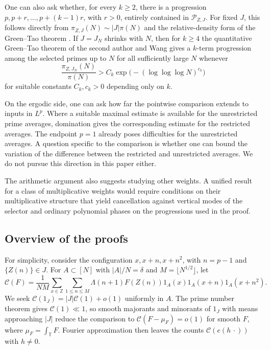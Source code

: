 \documentclass[12pt]{amsart}
\newcommand{\1}{\mathbf 1}
\theoremstyle{definition}
\begin{document}
One can also ask whether, for every $k\geq2$, there is a progression
$p,p+r,\ldots,p+(k-1)r$, with $r>0$, entirely contained in
$\mathcal P_{Z,J}$. For fixed $J$, this follows directly from
$\pi_{Z,J}(N)\sim |J|\pi(N)$ and the relative-density form of the
Green--Tao theorem \cite{GreenTao}. If $J=J_N$ shrinks with $N$, then for $k\geq4$ the quantitative
Green--Tao theorem of the second author and Wang
\cite[Theorem~1.1]{TeravainenWang} gives a $k$-term progression
among the selected primes up to $N$ for all sufficiently large
$N$ whenever
\[
 \frac{\pi_{Z,J_N}(N)}{\pi(N)}
 > C_k\exp\bigl(-(\log\log\log N)^{c_k}\bigr)
\]
for suitable constants $C_k,c_k>0$ depending only on $k$.

On the ergodic side, one can ask how far the pointwise comparison
extends to inputs in $L^p$. Where a suitable maximal estimate is available for the unrestricted
prime averages, domination gives the corresponding estimate for
the restricted averages. The endpoint $p=1$ already poses
difficulties for the unrestricted averages.
A question specific to the comparison is whether one can bound the
variation of the difference between the restricted and unrestricted
averages. We do not pursue this direction in this paper either. 

The arithmetic argument also suggests studying other weights. A
unified result for a class of multiplicative weights would require
conditions on their multiplicative structure that yield cancellation
against vertical modes of the selector and ordinary polynomial
phases on the progressions used in the proof. 

\subsection{Overview of the proofs}

For simplicity, consider the configuration $x,x+n,x+n^2$, with
$n=p-1$ and $\{Z(n)\}\in J$. For $A\subset[N]$ with $|A|/N =\delta$ and
$M=\lfloor N^{1/2}\rfloor$, let
\begin{equation}\label{e:formprim}
 \mathcal C(F)=\frac1{NM}\sum_{x\in\mathbb Z}\sum_{1\leq n\leq M}
 \Lambda(n+1)F(Z(n))1_A(x)1_A(x+n)1_A(x+n^2).
\end{equation}
We seek $\mathcal C(1_J)=|J|\mathcal C(1)+o(1)$ uniformly in $A$.
The prime number theorem gives $\mathcal C(1)\ll1$, so smooth
majorants and minorants of $1_J$ with means approaching $|J|$
reduce the comparison to $\mathcal C(F-\mu_F)=o(1)$ for smooth
$F$, where $\mu_F=\int_{\mathbb T}F$. Fourier approximation then
leaves the counts $\mathcal C(e(h\,\cdot))$ with $h\ne0$.
\end{document}
